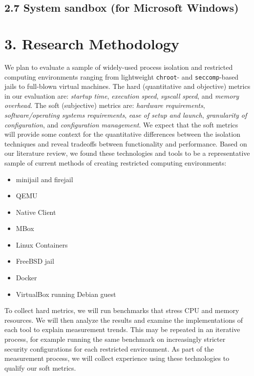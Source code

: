 \documentclass{proc}
\begin{document}
\subsection*{2.7 System sandbox (for Microsoft Windows)}

\section*{3. Research Methodology}
We plan to evaluate a sample of widely-used process isolation and restricted computing environments ranging from lightweight \texttt{chroot}- and \texttt{seccomp}-based jails to full-blown virtual machines. The hard (quantitative and objective) metrics in our evaluation are: \textit{startup time}, \textit{execution speed}, \textit{syscall speed}, and \textit{memory overhead}. The soft (subjective) metrics are: \textit{hardware requirements}, \textit{software/operating systems requirements}, \textit{ease of setup and launch}, \textit{granularity of configuration}, and \textit{configuration management}. We expect that the soft metrics will provide some context for the quantitative differences between the isolation techniques and reveal tradeoffs between functionality and performance.
\newline\newline
Based on our literature review, we found these technologies and tools to be a representative sample of current methods of creating restricted computing environments:\vspace{0.5em}
{\small
\begin{itemize}
\item minijail and firejail
\item QEMU
\item Native Client
\item MBox
\item Linux Containers
\item FreeBSD jail
\item Docker
\item VirtualBox running Debian guest
\end{itemize}
}
\noindent
To collect hard metrics, we will run benchmarks that stress CPU and memory resources. We will then analyze the results and examine the implementations of each tool to explain measurement trends. This may be repeated in an iterative process, for example running the same benchmark on increasingly stricter security configurations for each restricted environment. As part of the measurement process, we will collect experience using these technologies to qualify our soft metrics.
\end{document}
